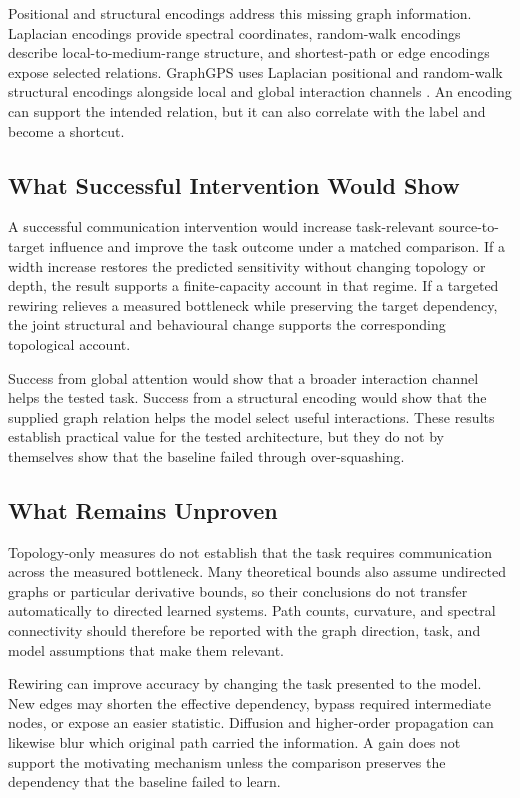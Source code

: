 Positional and structural encodings address this missing graph information.
Laplacian encodings provide spectral coordinates, random-walk encodings describe local-to-medium-range structure, and shortest-path or edge encodings expose selected relations.
GraphGPS uses Laplacian positional and random-walk structural encodings alongside local and global interaction channels \cite{rampasek2022gps}.
An encoding can support the intended relation, but it can also correlate with the label and become a shortcut.

\subsection{What Successful Intervention Would Show}

A successful communication intervention would increase task-relevant source-to-target influence and improve the task outcome under a matched comparison.
If a width increase restores the predicted sensitivity without changing topology or depth, the result supports a finite-capacity account in that regime.
If a targeted rewiring relieves a measured bottleneck while preserving the target dependency, the joint structural and behavioural change supports the corresponding topological account.

Success from global attention would show that a broader interaction channel helps the tested task.
Success from a structural encoding would show that the supplied graph relation helps the model select useful interactions.
These results establish practical value for the tested architecture, but they do not by themselves show that the baseline failed through over-squashing.

\subsection{What Remains Unproven}

Topology-only measures do not establish that the task requires communication across the measured bottleneck.
Many theoretical bounds also assume undirected graphs or particular derivative bounds, so their conclusions do not transfer automatically to directed learned systems.
Path counts, curvature, and spectral connectivity should therefore be reported with the graph direction, task, and model assumptions that make them relevant.

Rewiring can improve accuracy by changing the task presented to the model.
New edges may shorten the effective dependency, bypass required intermediate nodes, or expose an easier statistic.
Diffusion and higher-order propagation can likewise blur which original path carried the information.
A gain does not support the motivating mechanism unless the comparison preserves the dependency that the baseline failed to learn.

